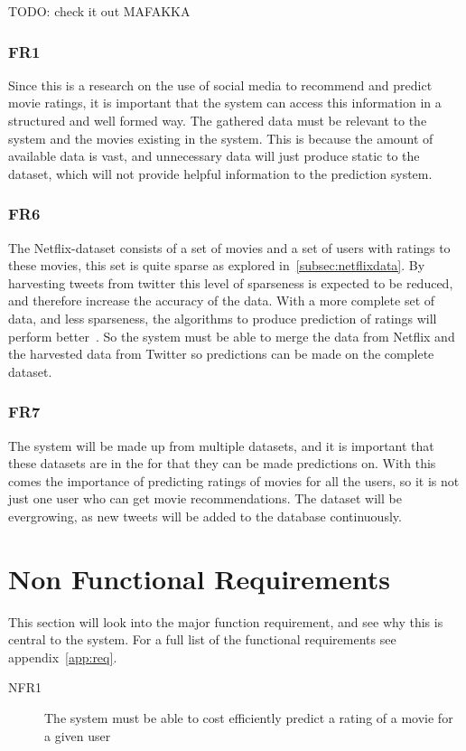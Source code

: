 TODO: check it out MAFAKKA
\subsubsection{FR1}
Since this is a research on the use of social media to recommend and predict movie ratings, it is important that the system can access this information in a structured and well formed way. The gathered data must be relevant to the system and the movies existing in the system. This is because the amount of available data is vast, and unnecessary data will just produce static to the dataset, which will not provide helpful information to the prediction system.

\subsubsection{FR6}
The Netflix-dataset consists of a set of movies and a set of users with ratings to these movies, this set is quite sparse as explored in~\ref{subsec:netflixdata}. By harvesting tweets from twitter this level of sparseness is expected to be reduced, and therefore increase the accuracy of the data. With a more complete set of data, and less sparseness, the algorithms to produce prediction of ratings will perform better~\cite{grobelnikDataSparsityIssues}. So the system must be able to merge the data from Netflix and the harvested data from Twitter so predictions can be made on the complete dataset.

\subsubsection{FR7}
The system will be made up from multiple datasets, and it is important that these datasets are in the for that they can be made predictions on. With this comes the importance of predicting ratings of movies for all the users, so it is not just one user who can get movie recommendations. The dataset will be evergrowing, as new tweets will be added to the database continuously.

\section{Non Functional Requirements}\label{section:non-functional-requirements}
This section will look into the major function requirement, and see why this is central to the system. For a full list of the functional requirements see appendix~\ref{app:req}.
\begin{description}
  \item[NFR1] The system must be able to cost efficiently predict a rating of a movie for a given user
\end{description}


